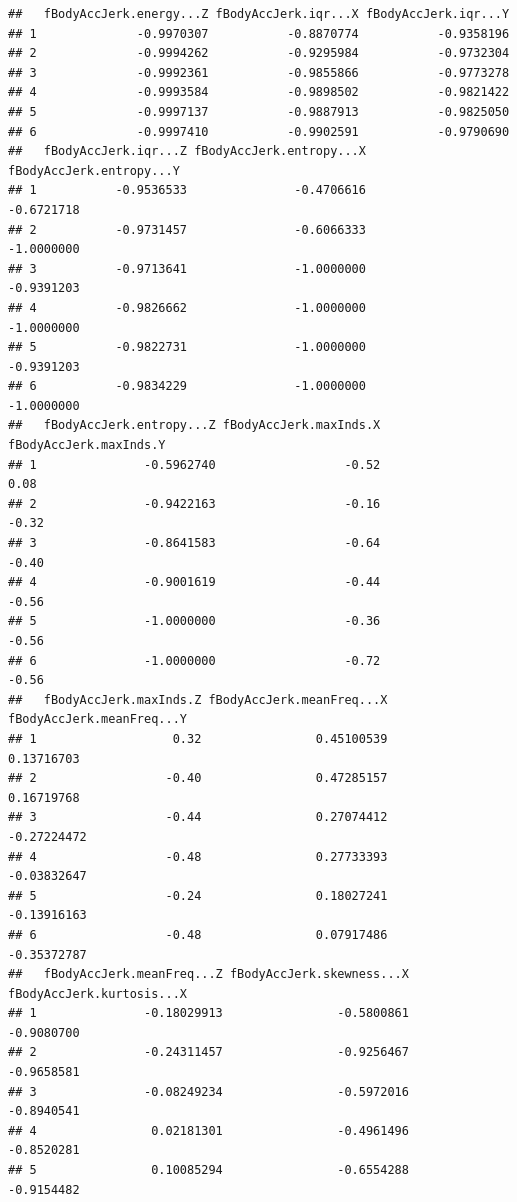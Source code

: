 \documentclass[
]{article}
\begin{document}
\begin{verbatim}
##   fBodyAccJerk.energy...Z fBodyAccJerk.iqr...X fBodyAccJerk.iqr...Y
## 1              -0.9970307           -0.8870774           -0.9358196
## 2              -0.9994262           -0.9295984           -0.9732304
## 3              -0.9992361           -0.9855866           -0.9773278
## 4              -0.9993584           -0.9898502           -0.9821422
## 5              -0.9997137           -0.9887913           -0.9825050
## 6              -0.9997410           -0.9902591           -0.9790690
##   fBodyAccJerk.iqr...Z fBodyAccJerk.entropy...X fBodyAccJerk.entropy...Y
## 1           -0.9536533               -0.4706616               -0.6721718
## 2           -0.9731457               -0.6066333               -1.0000000
## 3           -0.9713641               -1.0000000               -0.9391203
## 4           -0.9826662               -1.0000000               -1.0000000
## 5           -0.9822731               -1.0000000               -0.9391203
## 6           -0.9834229               -1.0000000               -1.0000000
##   fBodyAccJerk.entropy...Z fBodyAccJerk.maxInds.X fBodyAccJerk.maxInds.Y
## 1               -0.5962740                  -0.52                   0.08
## 2               -0.9422163                  -0.16                  -0.32
## 3               -0.8641583                  -0.64                  -0.40
## 4               -0.9001619                  -0.44                  -0.56
## 5               -1.0000000                  -0.36                  -0.56
## 6               -1.0000000                  -0.72                  -0.56
##   fBodyAccJerk.maxInds.Z fBodyAccJerk.meanFreq...X fBodyAccJerk.meanFreq...Y
## 1                   0.32                0.45100539                0.13716703
## 2                  -0.40                0.47285157                0.16719768
## 3                  -0.44                0.27074412               -0.27224472
## 4                  -0.48                0.27733393               -0.03832647
## 5                  -0.24                0.18027241               -0.13916163
## 6                  -0.48                0.07917486               -0.35372787
##   fBodyAccJerk.meanFreq...Z fBodyAccJerk.skewness...X fBodyAccJerk.kurtosis...X
## 1               -0.18029913                -0.5800861                -0.9080700
## 2               -0.24311457                -0.9256467                -0.9658581
## 3               -0.08249234                -0.5972016                -0.8940541
## 4                0.02181301                -0.4961496                -0.8520281
## 5                0.10085294                -0.6554288                -0.9154482

\end{verbatim}
\end{document}
